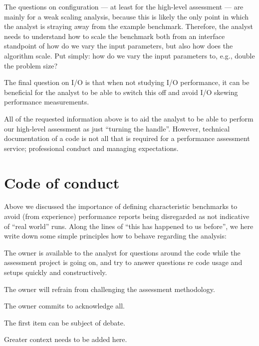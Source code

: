 The questions on configuration --- at least for the high-level assessment --- are mainly for a weak scaling analysis, because this is likely the only point in which the analyst is straying away from the example benchmark. Therefore, the analyst needs to understand how to scale the benchmark both from an interface standpoint of how do we vary the input parameters, but also how does the algorithm scale. Put simply: how do we vary the input parameters to, e.g., double the problem size? 

The final question on I/O is that when not studying I/O performance, it can be beneficial for the analyst to be able to switch this off and avoid I/O skewing performance measurements.

All of the requested information above is to aid the analyst to be able to perform our high-level assessment as just ``turning the handle''. However, technical documentation of a code is not all that is required for a performance assessment service; professional conduct and managing expectations.

\section{Code of conduct}

Above we discussed the importance of defining characteristic benchmarks to avoid (from experience) performance reports being disregarded as not indicative of ``real world'' runs. Along the lines of ``this has happened to us before'', we here write down some simple principles how to behave regarding the analysis:

\begin{checklist}
 \item The owner is available to the analyst for questions around the code while the assessment project is going on, and try to answer questions re code usage and setups quickly and constructively.
 \item The owner will refrain from challenging the assessment methodology.
 \item The owner commits to acknowledge all. 
\end{checklist}

\noindent
The first item can be subject of debate. 

\begin{wip}
    Greater context needs to be added here. 
\end{wip}


